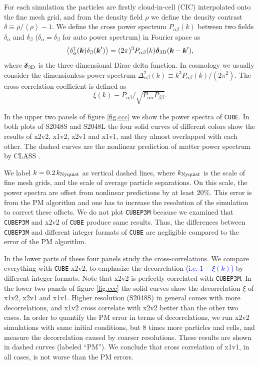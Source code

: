 \documentclass[10pt,twocolumn,preprint]{emulateapj}
\newcommand{\bs}{\boldsymbol}
\newcommand{\tcb}{\textcolor{blue}}
\begin{document}
For each simulation the particles are firstly cloud-in-cell (CIC) interpolated onto the fine mesh grid, and from the density field $\rho$ we define the density contrast $\delta\equiv \rho/\left\langle \rho \right\rangle-1$. We define the cross power spectrum $P_{\alpha\beta}(k)$ between two fields $\delta_\alpha$ and $\delta_\beta$ ($\delta_\alpha=\delta_\beta$ for auto power spectrum) in Fourier space as
\begin{equation}\label{eq.cps}
	\left\langle \delta_\alpha^\dagger({\bs k})\delta_\beta({\bs k}') \right\rangle=
    (2\pi)^3 P_{\alpha\beta}(k){\bs \delta}_{\rm 3D}({\bs k}-{\bs k}'),
\end{equation}
where ${\bs \delta}_{\rm 3D}$ is the three-dimensional Dirac delta function. In cosmology we usually consider the dimensionless power spectrum $\Delta^2_{\alpha\beta}(k)\equiv k^3 P_{\alpha\beta}(k)/(2\pi^2)$. The cross correlation coefficient is defined as
\begin{equation}\label{eq.ccc}
	\xi(k)\equiv P_{\alpha\beta}/\sqrt{P_{\alpha\alpha}P_{\beta\beta}}.
\end{equation}

In the upper two panels of figure \ref{fig.ccc} we show the power spectra of {\tt CUBE}. In both plots of S2048S and S2048L the four solid curves of different colors show the results of x2v2, x1v2, x2v1 and x1v1, and they almost overlapped with each other. The dashed curves are the nonlinear prediction of matter power spectrum by CLASS \citep{2011JCAP...07..034B}.

We label $k=0.2\,k_{\rm Nyquist}$ as vertical dashed lines, where $k_{\rm Nyquist}$ is the scale of fine mesh grids, and the scale of average particle separations. On this scale, the power spectra are offset from nonlinear predictions by at least 20\%. This error is from the PM algorithm and one has to increase the resolution of the simulation to correct these offsets. We do not plot {\tt CUBEP3M} because we examined that {\tt CUBEP3M} and x2v2 of {\tt CUBE} produce same results. Thus, the differences between {\tt CUBEP3M} and different integer formats of {\tt CUBE} are negligible compared to the error of the PM algorithm.

In the lower parts of these four panels study the cross-correlations. We compare everything with {\tt CUBE}-x2v2, to emphasize the decorrelation \tcb{(i.e. $1-\xi(k)$)} by different integer formats. Note that x2v2 is perfectly correlated with {\tt CUBEP3M}. In the lower two panels of figure \ref{fig.ccc} the solid curves show the decorrelation $\xi$ of x1v2, x2v1 and x1v1. Higher resolution (S2048S) in general comes with more decorrelations, and x1v2 cross correlate with x2v2 better than the other two cases. In order to quantify the PM error in terms of decorrelations, we run x2v2 simulations with same initial conditions, but 8 times more particles and cells, and measure the decorrelation caused by coarser resolutions. These results are shown in dashed curves (labeled ``PM''). We conclude that cross correlation of x1v1, in all cases, is not worse than the PM errors.
\end{document}

